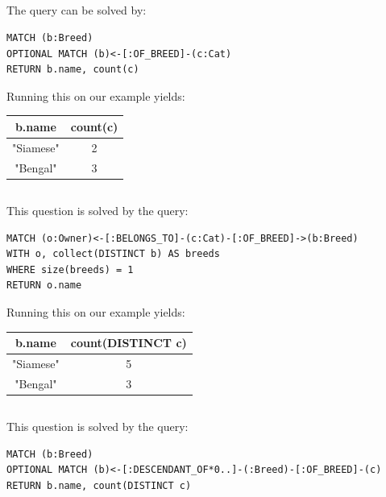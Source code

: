 \documentclass{article}
\begin{document}
\subsection{}
The query can be solved by:
\begin{lstlisting}
MATCH (b:Breed)
OPTIONAL MATCH (b)<-[:OF_BREED]-(c:Cat)
RETURN b.name, count(c)
\end{lstlisting}

Running this on our example yields:\\
\begin{center}
\begin{tabular}{|c|c|}
    \hline
    \textbf{b.name} & \textbf{count(c)} \\
    \hline
    "Siamese" & 2 \\
    \hline
    "Bengal" & 3 \\
    \hline
\end{tabular}
\end{center}
  

\subsection{}
This question is solved by the query:
\begin{lstlisting}
MATCH (o:Owner)<-[:BELONGS_TO]-(c:Cat)-[:OF_BREED]->(b:Breed)
WITH o, collect(DISTINCT b) AS breeds
WHERE size(breeds) = 1
RETURN o.name
\end{lstlisting}

Running this on our example yields:\\
\begin{center}
\begin{tabular}{|c|c|}
    \hline
    \textbf{b.name} & \textbf{count(DISTINCT c)} \\
    \hline
    "Siamese" & 5 \\
    \hline
    "Bengal" & 3 \\
    \hline
\end{tabular}
\end{center}
  

\subsection{}
This question is solved by the query:
\begin{lstlisting}
MATCH (b:Breed)
OPTIONAL MATCH (b)<-[:DESCENDANT_OF*0..]-(:Breed)-[:OF_BREED]-(c)
RETURN b.name, count(DISTINCT c)    
\end{lstlisting}
\end{document}
